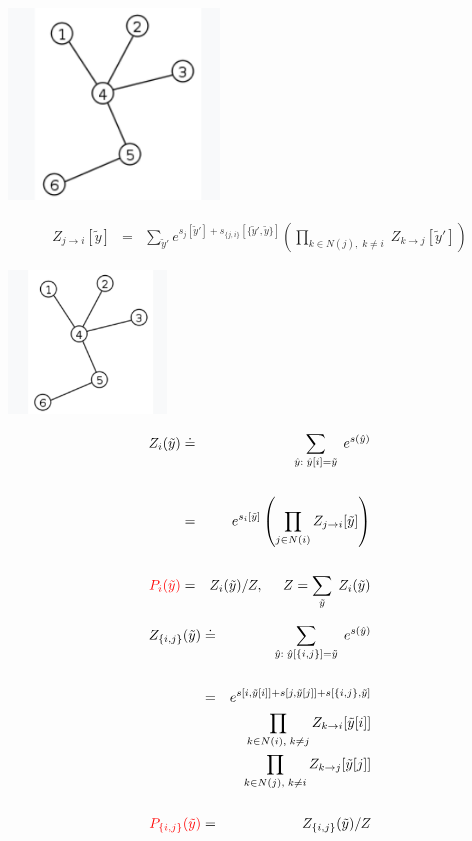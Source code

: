 {

\centerline{\includegraphics[height=2.0in]{../images/Tree}}

\vfill
\begin{eqnarray*}
  Z_{j\rightarrow i}[\tilde{y}] & = & \sum_{\tilde{y}'}  e^{s_j[\tilde{y}'] + s_{\{j,i\}}[\{\tilde{y}',\tilde{y}\}]}
    \left(\prod_{k \in N(j),\;k \not = i}\;Z_{k\rightarrow j}[\tilde{y}']\right)
\end{eqnarray*}


\centerline{\includegraphics[height=1.5in]{../images/Tree}}

\begin{eqnarray*}
Z_i(\tilde{y}) & \doteq & \sum_{\hat{y}:\; \hat{y}[i] = \tilde{y}} \;e^{s(\hat{y})} \\
\\
& = & e^{s_i[\tilde{y}]} \left(\prod_{j\in N(i)} Z_{j \rightarrow i}[\tilde{y}]\right) \\
\\
{\color{red} P_i(\tilde{y})} & = & Z_i(\tilde{y})/Z,\;\;\;\;\; Z = \sum_{\tilde{y}}\;Z_i(\tilde{y})
\end{eqnarray*}



\begin{eqnarray*}
Z_{\{i,j\}}(\tilde{y}) & \doteq & \sum_{\hat{y}:\; \hat{y}[\{i,j\}] = \tilde{y}} \;e^{s(\hat{y})} \\
\\
& = & e^{s[i,\tilde{y}[i]] + s[j,\tilde{y}[j]] +s[\{i,j\},\tilde{y}]} \\
& & \prod_{k\in N(i),\;k \not = j} Z_{k \rightarrow i}[\tilde{y}[i]] \\
& & \prod_{k\in N(j),\;k \not = i} Z_{k \rightarrow j}[\tilde{y}[j]] \\
\\
{\color{red} P_{\{i,j\}}(\tilde{y})} & = & Z_{\{i,j\}}(\tilde{y})/Z
\end{eqnarray*}

}
